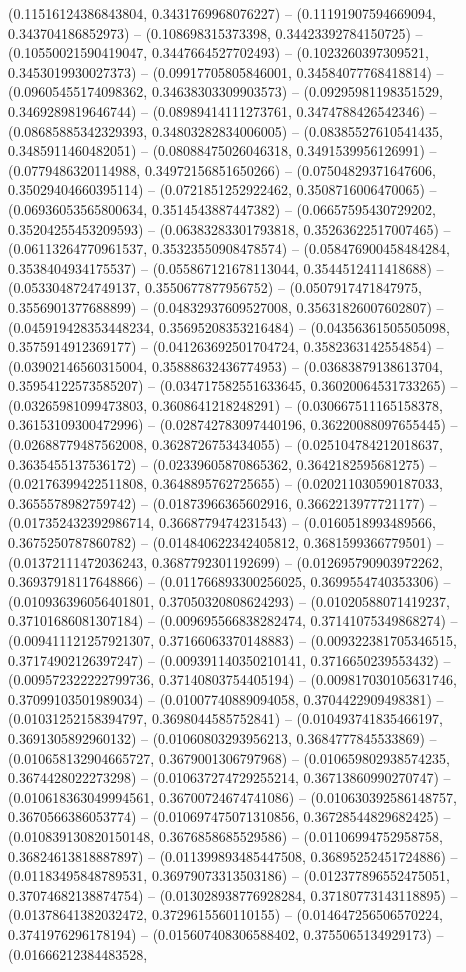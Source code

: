 (0.11516124386843804, 0.3431769968076227) -- (0.11191907594669094, 0.343704186852973) -- (0.108698315373398, 0.34423392784150725) -- (0.10550021590419047, 0.3447664527702493) -- (0.1023260397309521, 0.3453019930027373) -- (0.09917705805846001, 0.34584077768418814) -- (0.09605455174098362, 0.34638303309903573) -- (0.09295981198351529, 0.3469289819646744) -- (0.08989414111273761, 0.3474788426542346) -- (0.08685885342329393, 0.34803282834006005) -- (0.08385527610541435, 0.3485911460482051) -- (0.08088475026046318, 0.3491539956126991) -- (0.0779486320114988, 0.34972156851650266) -- (0.07504829371647606, 0.35029404660395114) -- (0.0721851252922462, 0.3508716006470065) -- (0.06936053565800634, 0.3514543887447382) -- (0.06657595430729202, 0.35204255453209593) -- (0.06383283301793818, 0.35263622517007465) -- (0.06113264770961537, 0.35323550908478574) -- (0.058476900458484284, 0.3538404934175537) -- (0.055867121678113044, 0.3544512411418688) -- (0.0533048724749137, 0.3550677877956752) -- (0.0507917471847975, 0.3556901377688899) -- (0.04832937609527008, 0.35631826007602807) -- (0.045919428353448234, 0.35695208353216484) -- (0.04356361505505098, 0.3575914912369177) -- (0.041263692501704724, 0.3582363142554854) -- (0.03902146560315004, 0.35888632436774953) -- (0.03683879138613704, 0.35954122573585207) -- (0.034717582551633645, 0.36020064531733265) -- (0.03265981099473803, 0.3608641218248291) -- (0.030667511165158378, 0.36153109300472996) -- (0.028742783097440196, 0.36220088097655445) -- (0.02688779487562008, 0.3628726753434055) -- (0.025104784212018637, 0.3635455137536172) -- (0.02339605870865362, 0.3642182595681275) -- (0.02176399422511808, 0.3648895762725655) -- (0.020211030590187033, 0.3655578982759742) -- (0.01873966365602916, 0.3662213977721177) -- (0.017352432392986714, 0.3668779474231543) -- (0.0160518993489566, 0.3675250787860782) -- (0.014840622342405812, 0.3681599366779501) -- (0.01372111472036243, 0.3687792301192699) -- (0.012695790903972262, 0.36937918117648866) -- (0.011766893300256025, 0.3699554740353306) -- (0.010936396056401801, 0.37050320808624293) -- (0.01020588071419237, 0.37101686081307184) -- (0.009695566838282474, 0.37141075349868274) -- (0.009411121257921307, 0.37166063370148883) -- (0.009322381705346515, 0.37174902126397247) -- (0.009391140350210141, 0.3716650239553432) -- (0.009572322222799736, 0.37140803754405194) -- (0.009817030105631746, 0.37099103501989034) -- (0.01007740889094058, 0.3704422909498381) -- (0.01031252158394797, 0.3698044585752841) -- (0.010493741835466197, 0.3691305892960132) -- (0.01060803293956213, 0.3684777845533869) -- (0.010658132904665727, 0.3679001306797968) -- (0.010659802938574235, 0.3674428022273298) -- (0.010637274729255214, 0.36713860990270747) -- (0.010618363049994561, 0.36700724674741086) -- (0.010630392586148757, 0.3670566386053774) -- (0.010697475071310856, 0.36728544829682425) -- (0.010839130820150148, 0.3676858685529586) -- (0.01106994752958758, 0.36824613818887897) -- (0.011399893485447508, 0.36895252451724886) -- (0.01183495848789531, 0.36979073313503186) -- (0.012377896552475051, 0.37074682138874754) -- (0.013028938776928284, 0.37180773143118895) -- (0.01378641382032472, 0.3729615560110155) -- (0.014647256506570224, 0.3741976296178194) -- (0.015607408306588402, 0.3755065134929173) -- (0.01666212384483528, 